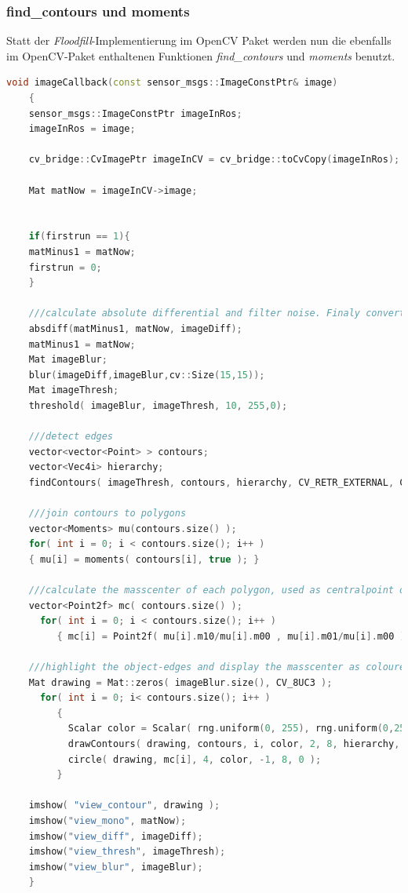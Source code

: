 	\newpage
	\subsubsection{find\_contours und moments}	
	Statt der \textit{Floodfill}-Implementierung im OpenCV Paket werden nun die ebenfalls im OpenCV-Paket enthaltenen Funktionen \textit{find\_contours} und \textit{moments} benutzt.
	
	\begin{lstlisting}[caption=imageCallbackV2 Funktion des Objekt-Erkennungs nodes, label=imageCallback-V2, title=imageCallback-V2, language=C++]
	void imageCallback(const sensor_msgs::ImageConstPtr& image)
	{
	sensor_msgs::ImageConstPtr imageInRos;
	imageInRos = image;
	
	cv_bridge::CvImagePtr imageInCV = cv_bridge::toCvCopy(imageInRos);
	
	Mat matNow = imageInCV->image;
	
	
	if(firstrun == 1){
	matMinus1 = matNow;
	firstrun = 0;
	}
	
	///calculate absolute differential and filter noise. Finaly convert to threshold image for improved contrast.
	absdiff(matMinus1, matNow, imageDiff);
	matMinus1 = matNow;
	Mat imageBlur;
	blur(imageDiff,imageBlur,cv::Size(15,15));
	Mat imageThresh;
	threshold( imageBlur, imageThresh, 10, 255,0);
	
	///detect edges
	vector<vector<Point> > contours;
	vector<Vec4i> hierarchy;
	findContours( imageThresh, contours, hierarchy, CV_RETR_EXTERNAL, CV_CHAIN_APPROX_SIMPLE, Point(0, 0) );
	
	///join contours to polygons
	vector<Moments> mu(contours.size() );
	for( int i = 0; i < contours.size(); i++ )
	{ mu[i] = moments( contours[i], true ); }
	
	///calculate the masscenter of each polygon, used as centralpoint of object
	vector<Point2f> mc( contours.size() );
	  for( int i = 0; i < contours.size(); i++ )
	     { mc[i] = Point2f( mu[i].m10/mu[i].m00 , mu[i].m01/mu[i].m00 ); }
	
	///highlight the object-edges and display the masscenter as coloured circle
	Mat drawing = Mat::zeros( imageBlur.size(), CV_8UC3 );
	  for( int i = 0; i< contours.size(); i++ )
	     {
	       Scalar color = Scalar( rng.uniform(0, 255), rng.uniform(0,255), rng.uniform(0,255) );
	       drawContours( drawing, contours, i, color, 2, 8, hierarchy, 0, Point() );
	       circle( drawing, mc[i], 4, color, -1, 8, 0 );
	     }
	
	imshow( "view_contour", drawing );
	imshow("view_mono", matNow);
	imshow("view_diff", imageDiff);
	imshow("view_thresh", imageThresh);
	imshow("view_blur", imageBlur);
	}
	\end{lstlisting}
	
